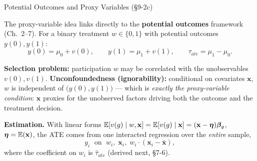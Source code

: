 \documentclass[aspectratio=169, 12pt]{beamer}
\begin{document}
\begin{frame}[shrink=12]{Potential Outcomes and Proxy Variables (\S9-2c)}

  The proxy-variable idea links directly to the \textbf{potential outcomes} framework
  (Ch.\ 2--7). For a binary treatment $w \in \{0,1\}$ with potential outcomes
  $y(0), y(1)$:
  \[
    y(0) = \mu_0 + v(0), \qquad y(1) = \mu_1 + v(1), \qquad
    \tau_{\mathit{ate}} = \mu_1 - \mu_0 .
  \]

  \begin{keybox}
    \textbf{Selection problem:} participation $w$ may be correlated with the
    unobservables $v(0), v(1)$. \textbf{Unconfoundedness (ignorability):} conditional
    on covariates $\mathbf{x}$, $w$ is independent of $\bigl(y(0), y(1)\bigr)$ ---
    which is \emph{exactly the proxy-variable condition}: $\mathbf{x}$ proxies for the
    unobserved factors driving both the outcome and the treatment decision.
  \end{keybox}

  \begin{highlightbox}
    \textbf{Estimation.} With linear forms
    $\operatorname{\mathbb{E}}[v(g)\mid w,\mathbf{x}] = \operatorname{\mathbb{E}}[v(g)\mid \mathbf{x}]
      = (\mathbf{x}-\boldsymbol\eta)\boldsymbol\beta_g$, $\boldsymbol\eta = \operatorname{\mathbb{E}}(\mathbf{x})$,
    the ATE comes from one interacted regression over the \emph{entire} sample,
    \[
      y_i \;\text{ on }\; w_i,\; \mathbf{x}_i,\; w_i\cdot(\mathbf{x}_i - \bar{\mathbf{x}}),
    \]
    where the coefficient on $w_i$ is $\hat\tau_{\mathit{ate}}$ (derived next, \S7-6).
  \end{highlightbox}

\end{frame}
\end{document}
